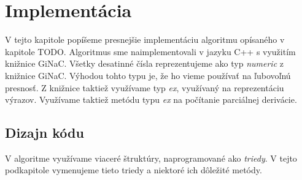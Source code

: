 \chapter{Implementácia}
\label{kap:implemetation}

V tejto kapitole popíšeme presnejšie implementáciu algoritmu opísaného v kapitole TODO.
Algoritmus sme naimplementovali v jazyku C++ s využitím knižnice GiNaC. Všetky desatinné čísla
reprezentujeme ako typ \textit{numeric} z knižnice GiNaC. Výhodou tohto typu je, že ho vieme 
používať na ľubovoľnú presnosť. Z knižnice taktiež využívame typ \textit{ex}, využívaný na 
reprezentáciu výrazov. Využívame taktiež metódu typu \textit{ex} na počítanie parciálnej derivácie.

\section{Dizajn kódu}

V algoritme využívame viaceré štruktúry, naprogramované ako \textit{triedy}. V tejto podkapitole
vymenujeme tieto triedy a niektoré ich dôležité metódy.


